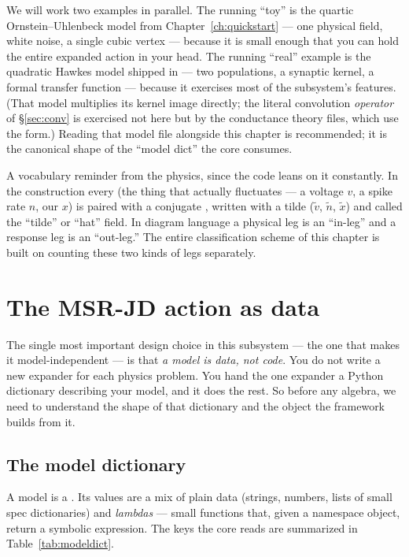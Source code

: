 We will work two examples in parallel. The running ``toy'' is the quartic
Ornstein--Uhlenbeck model from Chapter~\ref{ch:quickstart} --- one physical field,
white noise, a single cubic vertex --- because it is small enough that you can
hold the entire expanded action in your head. The running ``real'' example is the
quadratic Hawkes model shipped in  --- two
populations, a synaptic kernel, a formal transfer function --- because
it exercises most of the subsystem's features. (That model multiplies its kernel
image directly; the literal  convolution \emph{operator} of
\S\ref{sec:conv} is exercised not here but by the conductance theory files, which
use the  form.) Reading that model file alongside
this chapter is recommended; it is the canonical shape of the ``model dict'' the
core consumes.

\begin{note}
A vocabulary reminder from the physics, since the code leans on it constantly. In
the \msrjd{} construction every  (the thing that actually
fluctuates --- a voltage $v$, a spike rate $n$, our $x$) is paired with a
conjugate , written with a tilde ($\tilde v$, $\tilde n$,
$\tilde x$) and called the ``tilde'' or ``hat'' field. In diagram language a
physical leg is an ``in-leg'' and a response leg is an ``out-leg.'' The entire
classification scheme of this chapter is built on counting these two kinds of
legs separately.
\end{note}

\section{The MSR-JD action as data}

The single most important design choice in this subsystem --- the one that makes
it model-independent --- is that \emph{a model is data, not code}. You do not
write a new expander for each physics problem. You hand the one expander a Python
dictionary describing your model, and it does the rest. So before any algebra, we
need to understand the shape of that dictionary and the object the framework
builds from it.

\subsection{The model dictionary}

A model is a . Its values are a mix of plain data (strings, numbers,
lists of small spec dictionaries) and \emph{lambdas} --- small functions that,
given a namespace object, return a symbolic expression. The keys the core reads
are summarized in Table~\ref{tab:modeldict}.

